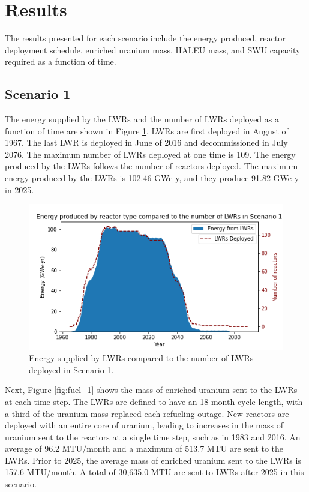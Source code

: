 \section{Results}
The results presented for each scenario include the energy produced, reactor 
deployment schedule, enriched
uranium mass, \gls{HALEU} mass, and \gls{SWU} capacity required as a function 
of time. 

\subsection{Scenario 1}
The energy supplied by the \glspl{LWR} and the number of \glspl{LWR}
deployed as a function of time are shown in Figure \ref{fig:energy_rx_1}. 
\glspl{LWR} are first deployed in August of 1967. The last 
\gls{LWR} is deployed in June of 2016 and decommissioned in July 2076. The 
maximum number of 
\glspl{LWR} deployed at one time is 109. The energy produced by the 
\glspl{LWR} follows the number of reactors deployed. The maximum energy 
produced by the \glspl{LWR} is 102.46 GWe-y, and they produce 91.82 GWe-y 
in 2025.

\begin{figure}
    \centering 
    \includegraphics[width=\textwidth]{../figures/energy_scenario1.png}
    \caption{Energy supplied by \glspl{LWR} compared to the number of 
    \glspl{LWR} deployed in Scenario 1.}
    \label{fig:energy_rx_1}
\end{figure}

Next, Figure \ref{fig:fuel_1} shows the mass of enriched uranium sent to 
the \glspl{LWR} at each time step. The \glspl{LWR} are 
defined to have an 18 month cycle length, with a third of the uranium 
mass replaced each refueling outage. New reactors 
are deployed with an entire core of uranium, leading 
to increases in the mass of uranium sent to the reactors at a single time 
step, such 
as in 1983 and 2016. An average of 96.2 MTU/month and a maximum of 513.7 MTU 
are sent to the \glspl{LWR}. Prior to 2025, the average mass
of enriched uranium sent to the \glspl{LWR} is 157.6 MTU/month. A total 
of 30,635.0 MTU are sent to \glspl{LWR} after 2025 in this scenario. 

